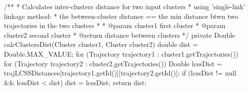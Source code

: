 {    /**
     * Calculates inter-clusters distance for two input clusters
     * using 'single-link' linkage method:
     * the between-cluster distance == the min distance btwn two trajectories in the two clusters
     *
     * @param cluster1 first cluster
     * @param cluster2 second cluster
     * @return distance between clusters
     */
    private Double calcClustersDist(Cluster cluster1, Cluster cluster2) {
        double dist = Double.MAX_VALUE;
        for (Trajectory trajectory1 : cluster1.getTrajectories()) {
            for (Trajectory trajectory2 : cluster2.getTrajectories()) {
                Double lcssDist = trajLCSSDistances[trajectory1.getId()][trajectory2.getId()];
                if (lcssDist != null && lcssDist < dist)
                    dist = lcssDist;
            }
        }
        return dist;
    }

}
